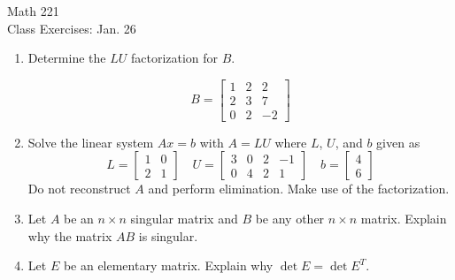 \documentclass[11pt]{article}
\begin{document}
\begin{center}
\Large
\rm{Math 221}
\\
\rm{Class Exercises:  Jan. 26}
\\
\end{center}
\vspace{0.2in}

\begin{enumerate}
	\item {Determine the $LU$ factorization for $B$.

\begin{displaymath}
B = \left[ \begin{array}{rrr} 1 & 2 & 2  \\ 2 & 3 & 7 \\ 0 & 2 & -2 
\end{array}\right]
\end{displaymath}
}
\vspace{2in}
\item{
Solve the linear system $Ax=b$ with $A=LU$ where $L$, $U$, and $b$ given as 
\begin{displaymath}
L = \left[ \begin{array}{rr} 1 &  0 \\ 2 & 1 \end{array} \right] \quad 
U = \left[ \begin{array}{rrrr} 3 &  0 & 2 & -1 \\ 0 & 4 & 2 & 1 \end{array} \right] \quad 
b = \left[ \begin{array}{r} 4  \\ 6 \end{array} \right]
\end{displaymath}
Do not reconstruct $A$  and perform elimination. Make use of the factorization.
}
\vspace{3in}
\item{Let $A$ be an $n\times n$ singular matrix and $B$ be any other $n\times n$ matrix.  Explain why the matrix $AB$ is singular.}

\item{Let $E$ be an elementary matrix.  Explain why $\det{E} = \det{E^T}$.}

\end{enumerate}
\end{document}
